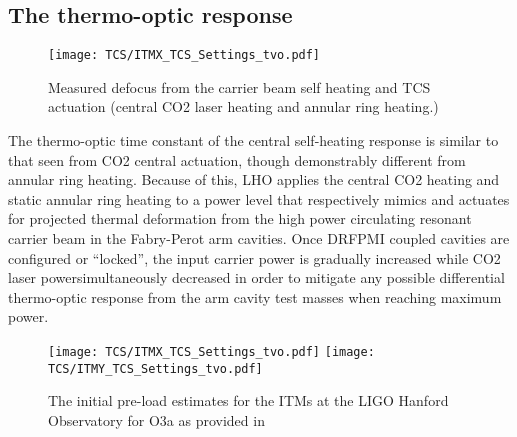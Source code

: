 \subsection{The thermo-optic response}
\begin{figure}[!ht]
  \centering
  \begin{subcaptiongroup}
	  \texttt{[image: TCS/ITMX\_TCS\_Settings\_tvo.pdf]}
	  \label{TO_response}
  \end{subcaptiongroup}
  \captionsetup{subrefformat=parens}
  \hfill
  \caption{Measured defocus from the carrier beam self heating and TCS actuation (central CO2 laser heating and annular ring heating.)} 
\label{fig:thermooptic_response}
\end{figure}
The thermo-optic time constant of the central self-heating response is similar to that seen from CO2 central actuation, though demonstrably different from annular ring heating. Because of this, LHO applies the central CO2 heating and static annular ring heating to a power level that respectively mimics and actuates for projected thermal deformation from the high power circulating resonant carrier beam in the Fabry-Perot arm cavities. Once DRFPMI coupled cavities are configured or ``locked'', the input carrier power is gradually increased while CO2 laser powersimultaneously decreased in order to mitigate any possible differential thermo-optic response from the arm cavity test masses when reaching maximum power.
\begin{figure}[!ht]
  \centering
  \begin{subcaptiongroup}
	  \texttt{[image: TCS/ITMX\_TCS\_Settings\_tvo.pdf]}
	  \label{ITMX_TCS}
	  \texttt{[image: TCS/ITMY\_TCS\_Settings\_tvo.pdf]}
	  \label{ITMY_TCS}
  \end{subcaptiongroup}
  \captionsetup{subrefformat=parens}
  \hfill
  \caption{The initial pre-load estimates for the ITMs at the LIGO Hanford Observatory for O3a as provided in \cite{tvo}} 
  \label{fig:O3_preload_tvo}
\end{figure}


